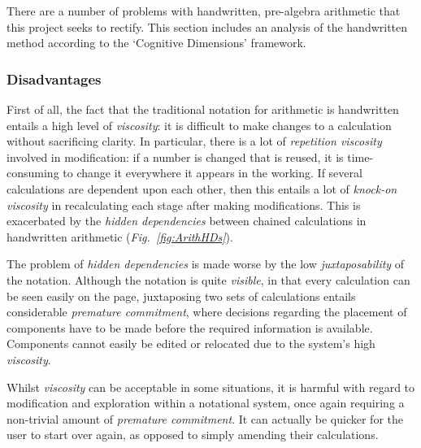 \documentclass[12pt,twoside,notitlepage,xetex]{report}
\begin{document}
There are a number of problems with handwritten, pre-algebra arithmetic that this project seeks to rectify.  This section includes an analysis of the handwritten method according to the `Cognitive Dimensions' framework.

\subsubsection{Disadvantages}
First of all, the fact that the traditional notation for arithmetic is handwritten entails a high level of \emph{viscosity}: it is difficult to make changes to a calculation without sacrificing clarity.  In particular, there is a lot of \emph{repetition viscosity} involved in modification: if a number is changed that is reused, it is time-consuming to change it everywhere it appears in the working.  If several calculations are dependent upon each other, then this entails a lot of \emph{knock-on viscosity} in recalculating each stage after making modifications.  This is exacerbated by the \emph{hidden dependencies} between chained calculations in handwritten arithmetic (\emph{Fig.~\ref{fig:ArithHDs}}).

The problem of \emph{hidden dependencies} is made worse by the low \emph{juxtaposability} of the notation.  Although the notation is quite \emph{visible}, in that every calculation can be seen easily on the page, juxtaposing two sets of calculations entails considerable \emph{premature commitment}, where decisions regarding the placement of components have to be made before the required information is available.  Components cannot easily be edited or relocated due to the system's high \emph{viscosity}.

Whilst \emph{viscosity} can be acceptable in some situations, it is harmful with regard to modification and exploration within a notational system, once again requiring a non-trivial amount of \emph{premature commitment}.  It can actually be quicker for the user to start over again, as opposed to simply amending their calculations.
\end{document}
